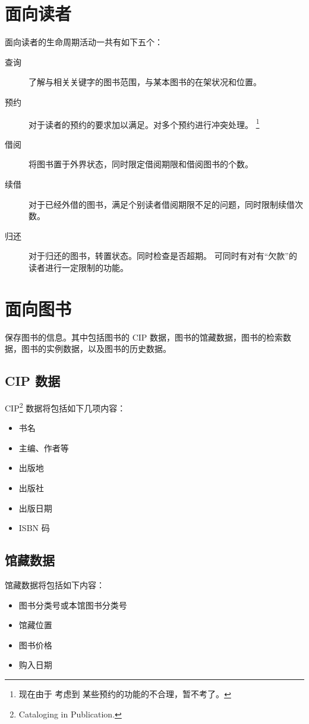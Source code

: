 \documentclass[UTF8]{report}
\begin{document}
    \section{面向读者}
    面向读者的生命周期活动一共有如下五个：
    \begin{description}
    	\item[查询] 了解与相关关键字的图书范围，与某本图书的在架状况和位置。
    	\item[预约] 对于读者的预约的要求加以满足。对多个预约进行冲突处理。
        \footnote{现在由于 考虑到 某些预约的功能的不合理，暂不考了。}
    	\item[借阅] 将图书置于外界状态，同时限定借阅期限和借阅图书的个数。
    	\item[续借] 对于已经外借的图书，满足个别读者借阅期限不足的问题，同时限制续借次数。
    	\item[归还] 对于归还的图书，转置状态。同时检查是否超期。
        可同时有对有“欠款”的读者进行一定限制的功能。
    \end{description}
    \section{面向图书}
    保存图书的信息。其中包括图书的 CIP 数据，图书的馆藏数据，图书的检索数据，图书的实例数据，以及图书的历史数据。
    \subsection{CIP 数据}
    CIP\footnote{Cataloging in Publication.}  数据将包括如下几项内容：
    \begin{itemize}
    	\item 书名
    	\item 主编、作者等
    	\item 出版地
    	\item 出版社
    	\item 出版日期
    	\item ISBN 码
    \end{itemize}
    \subsection{馆藏数据}
    馆藏数据将包括如下内容：
    \begin{itemize}
    	\item 图书分类号或本馆图书分类号
    	\item 馆藏位置
    	\item 图书价格
    	\item 购入日期
    \end{itemize}
\end{document}
